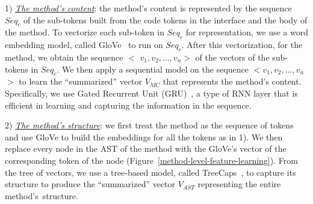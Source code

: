 1) {\em \underline{The method's content}}: the method's content is
represented by the sequence $Seq_c$ of the sub-tokens built from the
code tokens in the interface and the body of the method. To vectorize
each sub-token in $Seq_c$ for representation, we use a word embedding
model, called GloVe~\cite{glove2014} to run on $Seq_c$. After this
vectorization, for the method, we obtain the sequence $<$ $v_1, v_2,
..., v_n$$>$ of the vectors of the sub-tokens in $Seq_c$.  We then
apply a sequential model on the sequence $<$$v_1,v_2,...,v_n$$>$ to learn
the ``summarized'' vector $V_{MC}$ that represents the method's
content. Specifically, we use Gated Recurrent Unit
(GRU)~\cite{cho2014learning}, a type of RNN layer that is efficient in
learning and capturing the information in the sequence.


2) {\em \underline{The method's structure}}: we first treat the
method as the sequence of tokens and use GloVe to build
the embeddings for all the tokens as in 1). We then replace every node
in the AST of the method with the GloVe's vector of the corresponding
token of the node (Figure~\ref{method-level-feature-learning}).  From
the tree of vectors, we use a tree-based model, called
TreeCaps~\cite{bui2021treecaps}, to capture its structure to
produce the ``summarized'' vector $V_{AST}$ representing the entire
method's~structure.


